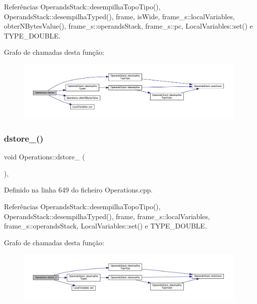 Referências Operands\+Stack\+::desempilha\+Topo\+Tipo(), Operands\+Stack\+::desempilha\+Typed(), frame, is\+Wide, frame\+\_\+s\+::local\+Variables, obter\+N\+Bytes\+Value(), frame\+\_\+s\+::operands\+Stack, frame\+\_\+s\+::pc, Local\+Variables\+::set() e T\+Y\+P\+E\+\_\+\+D\+O\+U\+B\+LE.

Grafo de chamadas desta função\+:\nopagebreak
\begin{figure}[H]
\begin{center}
\leavevmode
\includegraphics[width=350pt]{classOperations_a83fb57afed30b1223f8485492f9d9958_cgraph}
\end{center}
\end{figure}
\mbox{\label{classOperations_a54dd25692395f6671a3a8e21c73eef6d}} 
\subsubsection{\texorpdfstring{dstore\+\_()}{dstore\_0()}}
{\footnotesize\ttfamily void Operations\+::dstore\+\_ (\begin{DoxyParamCaption}{ }\end{DoxyParamCaption})\hspace{0.3cm}{\ttfamily [static]}, {\ttfamily [private]}}



Definido na linha 649 do ficheiro Operations.\+cpp.



Referências Operands\+Stack\+::desempilha\+Topo\+Tipo(), Operands\+Stack\+::desempilha\+Typed(), frame, frame\+\_\+s\+::local\+Variables, frame\+\_\+s\+::operands\+Stack, Local\+Variables\+::set() e T\+Y\+P\+E\+\_\+\+D\+O\+U\+B\+LE.

Grafo de chamadas desta função\+:\nopagebreak
\begin{figure}[H]
\begin{center}
\leavevmode
\includegraphics[width=350pt]{classOperations_a54dd25692395f6671a3a8e21c73eef6d_cgraph}
\end{center}
\end{figure}
\mbox{\label{classOperations_a5f12c99fca34f123522a6c1461782e5f}} 
